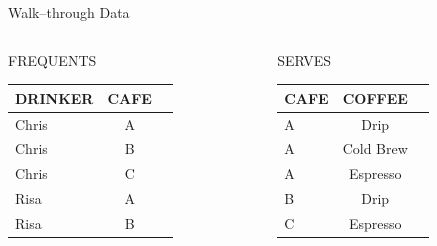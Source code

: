 \documentclass[aspectratio=169]{beamer}
\begin{document}
\begin{frame}{Walk--through Data}

%
%
\begin{columns}[t]
\begin{column}{0.5\textwidth}
FREQUENTS\\
\begin{tabular}{|l|c|c| }  \hline
\textrm{DRINKER} & \textrm{CAFE}\\ \hline
Chris & A \\ \hline
Chris & B\\ \hline
Chris & C  \\ \hline
Risa & A\\ \hline
Risa & B \\ \hline
\end{tabular}
\end{column}
\begin{column}{0.5\textwidth}
SERVES\\
\begin{tabular}{|l|c|c| }  \hline
\textrm{CAFE} & \textrm{COFFEE}\\ \hline
A & Drip\\ \hline
A & Cold Brew \\ \hline
A &  Espresso \\ \hline
B & Drip  \\ \hline
C & Espresso \\ \hline
\end{tabular}
\end{column}
\end{columns}
\end{frame}
\end{document}
